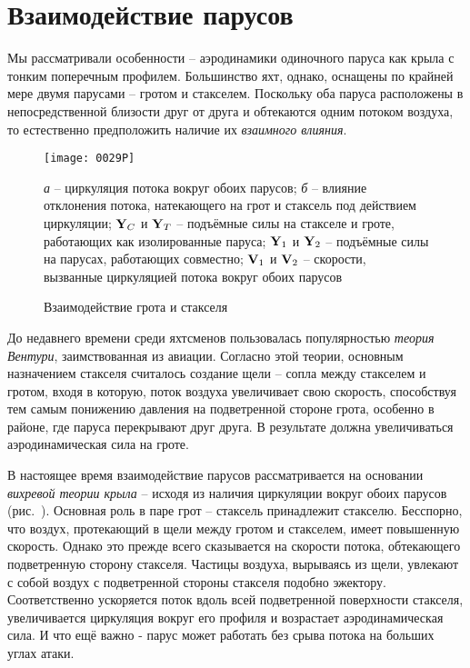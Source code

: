 \section{Взаимодействие парусов}

Мы рассматривали особенности \--- аэродинамики одиночного паруса как
крыла с тонким поперечным профилем. Большинство яхт, однако, оснащены
по крайней мере двумя парусами \--- гротом и стакселем. Поскольку оба
паруса расположены в непосредственной близости друг от друга и
обтекаются одним потоком воздуха, то естественно предположить наличие
их \textit{взаимного влияния}.

\begin{figure}[htb]
  \centering
  \texttt{[image: 0029P]}
  \caption{Взаимодействие грота и стакселя}
  \label{fig:29}
  \small
  \centering{}
  \textit{а} \--- циркуляция потока вокруг обоих парусов; \textit{б} \--- влияние отклонения потока, натекающего на грот и стаксель под действием циркуляции; $\mathbf{Y}_C$ и $\mathbf{Y}_T$ \--- подъёмные силы на стакселе и гроте, работающих как изолированные паруса; $\mathbf{Y}_1$ и $\mathbf{Y}_2$ \--- подъёмные силы на парусах, работающих совместно; $\mathbf{V}_1$ и $\mathbf{V}_2$ \--- скорости, вызванные циркуляцией потока вокруг обоих парусов
\end{figure}

До недавнего времени среди яхтсменов пользовалась популярностью \textit{теория
Вентури},
заимствованная из авиации. Согласно этой теории, основным
назначением стакселя считалось создание щели \--- сопла между
стакселем и гротом, входя в которую, поток воздуха увеличивает свою
скорость, способствуя тем самым понижению давления на подветренной
стороне грота, особенно в районе, где паруса перекрывают друг друга. В
результате должна увеличиваться аэродинамическая сила на гроте.

В настоящее время взаимодействие парусов рассматривается на основании
\textit{вихревой теории крыла} \--- исходя из
наличия циркуляции вокруг обоих парусов (рис.~). Основная роль
в паре грот \--- стаксель принадлежит стакселю. Бесспорно, что воздух,
протекающий в щели между гротом и стакселем, имеет повышенную
скорость. Однако это прежде всего сказывается на скорости потока,
обтекающего подветренную сторону стакселя. Частицы воздуха, вырываясь
из щели, увлекают с собой воздух с подветренной стороны стакселя
подобно эжектору. Соответственно ускоряется поток вдоль всей
подветренной поверхности стакселя, увеличивается циркуляция вокруг его
профиля и возрастает аэродинамическая сила. И что ещё важно - парус
может работать без срыва потока на больших углах атаки.
 
